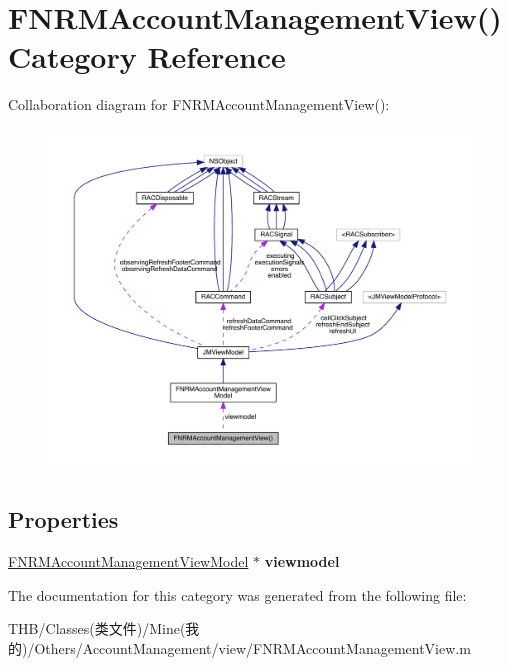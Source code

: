 \hypertarget{category_f_n_r_m_account_management_view_07_08}{}\section{F\+N\+R\+M\+Account\+Management\+View() Category Reference}
\label{category_f_n_r_m_account_management_view_07_08}


Collaboration diagram for F\+N\+R\+M\+Account\+Management\+View()\+:\nopagebreak
\begin{figure}[H]
\begin{center}
\leavevmode
\includegraphics[width=350pt]{category_f_n_r_m_account_management_view_07_08__coll__graph}
\end{center}
\end{figure}
\subsection*{Properties}
\begin{DoxyCompactItemize}
\item 
\mbox{\label{category_f_n_r_m_account_management_view_07_08_a7f680926a8c5ca8ab8d787a9088740ca}} 
\mbox{\hyperlink{interface_f_n_r_m_account_management_view_model}{F\+N\+R\+M\+Account\+Management\+View\+Model}} $\ast$ {\bfseries viewmodel}
\end{DoxyCompactItemize}


The documentation for this category was generated from the following file\+:\begin{DoxyCompactItemize}
\item 
T\+H\+B/\+Classes(类文件)/\+Mine(我的)/\+Others/\+Account\+Management/view/F\+N\+R\+M\+Account\+Management\+View.\+m\end{DoxyCompactItemize}
